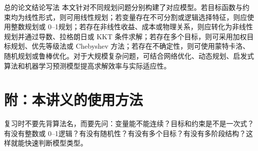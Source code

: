 \documentclass[UTF8,12pt,a4paper]{ctexart}
\begin{document}
\begin{examplebox}{总的论文结论写法}
本文针对不同规划问题分别构建了对应模型。若目标函数与约束均为线性形式，则可用线性规划；若变量存在不可分割或逻辑选择特征，则应使用整数规划或 0--1规划；若存在非线性收益、成本或物理关系，则应转化为非线性规划并通过导数、拉格朗日或 KKT 条件求解；若存在多个目标，则可采用加权目标规划、优先等级法或 Chebyshev 方法；若存在不确定性，则可使用蒙特卡洛、随机规划或鲁棒优化。对于大规模复杂问题，可结合网络优化、动态规划、启发式算法和机器学习预测模型提高求解效率与实际适应性。
\end{examplebox}

\section*{附：本讲义的使用方法}
复习时不要先背算法名，而要先问：变量能不能连续？目标和约束是不是一次式？有没有整数或 0--1逻辑？有没有随机性？有没有多个目标？有没有多阶段结构？这样就能快速判断模型类型。
\end{document}
